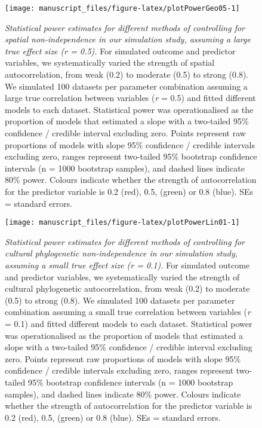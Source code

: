 \documentclass[
  man,floatsintext]{apa6}
\begin{document}
\newpage



\begin{figure}[H]
\texttt{[image: manuscript\_files/figure-latex/plotPowerGeo05-1]} \caption{\emph{Statistical power estimates for different methods of controlling for spatial non-independence in our simulation study, assuming a large true effect size (r = 0.5).} For simulated outcome and predictor variables, we systematically varied the strength of spatial autocorrelation, from weak (0.2) to moderate (0.5) to strong (0.8). We simulated 100 datasets per parameter combination assuming a large true correlation between variables (\emph{r} = 0.5) and fitted different models to each dataset. Statistical power was operationalised as the proportion of models that estimated a slope with a two-tailed 95\% confidence / credible interval excluding zero. Points represent raw proportions of models with slope 95\% confidence / credible intervals excluding zero, ranges represent two-tailed 95\% bootstrap confidence intervals (n = 1000 bootstrap samples), and dashed lines indicate 80\% power. Colours indicate whether the strength of autocorrelation for the predictor variable is 0.2 (red), 0.5, (green) or 0.8 (blue). SEs = standard errors.}\label{fig:plotPowerGeo05}
\end{figure}

\newpage



\begin{figure}[H]
\texttt{[image: manuscript\_files/figure-latex/plotPowerLin01-1]} \caption{\emph{Statistical power estimates for different methods of controlling for cultural phylogenetic non-independence in our simulation study, assuming a small true effect size (r = 0.1).} For simulated outcome and predictor variables, we systematically varied the strength of cultural phylogenetic autocorrelation, from weak (0.2) to moderate (0.5) to strong (0.8). We simulated 100 datasets per parameter combination assuming a small true correlation between variables (\emph{r} = 0.1) and fitted different models to each dataset. Statistical power was operationalised as the proportion of models that estimated a slope with a two-tailed 95\% confidence / credible interval excluding zero. Points represent raw proportions of models with slope 95\% confidence / credible intervals excluding zero, ranges represent two-tailed 95\% bootstrap confidence intervals (n = 1000 bootstrap samples), and dashed lines indicate 80\% power. Colours indicate whether the strength of autocorrelation for the predictor variable is 0.2 (red), 0.5, (green) or 0.8 (blue). SEs = standard errors.}\label{fig:plotPowerLin01}
\end{figure}
\end{document}
